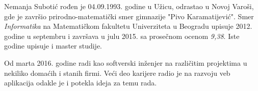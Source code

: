\documentclass[12pt,oneside]{memoir}
\begin{document}
\begin{biografija}
Nemanja Subotić rođen je 04.09.1993. godine u Užicu, odrastao u Novoj Varoši,
gde je završio prirodno-matematički smer gimnazije "Pivo Karamatijević".
Smer \emph{Informatika} na Matematičkom fakultetu Univerziteta u Beogradu upisuje
2012. godine u septembru i završava u julu 2015. sa prosečnom ocenom \emph{9,38}.
Iste godine upisuje i master studije.

Od marta 2016. godine radi kao softverski inženjer na različitim projektima u
nekiliko domaćih i stanih firmi. Veći deo karijere radio je na razvoju veb
aplikacija odakle je i potekla ideja za temu rada.
\end{biografija}
\end{document}
